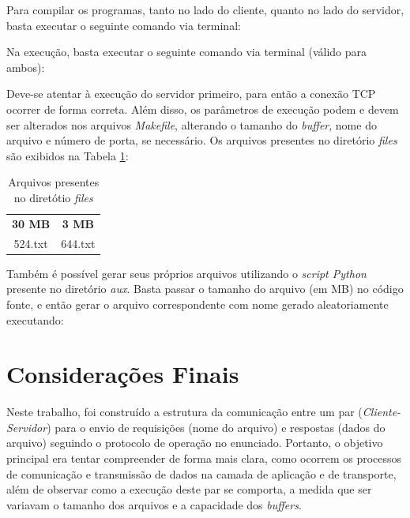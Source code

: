 \documentclass[a4paper, 12pt]{article}
\begin{document}
\noindent Para compilar os programas, tanto no lado do cliente, quanto no lado do servidor, basta executar o seguinte comando via terminal:

\begin{center}
\end{center}

\noindent Na execução, basta executar o seguinte comando via terminal (válido para ambos):

\begin{center}
\end{center}

Deve-se atentar à execução do servidor primeiro, para então a conexão TCP ocorrer de forma correta. Além disso, os parâmetros de execução podem e devem ser alterados nos arquivos \emph{Makefile}, alterando o tamanho do \emph{buffer}, nome do arquivo e número de porta, se necessário. Os arquivos presentes no diretório \emph{files} são exibidos na Tabela \ref{tab:exampleTab4}:

\begin{table}[H]
    \centering
    \caption{Arquivos presentes no diretótio \emph{files}}\vspace{0.3cm}
    \label{tab:exampleTab4}
    \begin{tabular}{c|c}
     \textbf{30 MB} & \textbf{3 MB}\\
     524.txt & 644.txt
    \end{tabular}
\end{table}

Também é possível gerar seus próprios arquivos utilizando o \emph{script Python} presente no diretório \emph{aux}. Basta passar o tamanho do arquivo (em MB) no código fonte, e então gerar o arquivo correspondente com nome gerado aleatoriamente executando:

\begin{center}
\end{center}

\section{Considerações Finais}

Neste trabalho, foi construído a estrutura da comunicação entre um par (\emph{Cliente-Servidor}) para o envio de requisições (nome do arquivo) e respostas (dados do arquivo) seguindo o protocolo de operação no enunciado. Portanto, o objetivo principal era tentar compreender de forma mais clara, como ocorrem os processos de comunicação e transmissão de dados na camada de aplicação e de transporte, além de observar como a execução deste par se comporta, a medida que ser variavam o tamanho dos arquivos e a capacidade dos \emph{buffers}.
\end{document}
